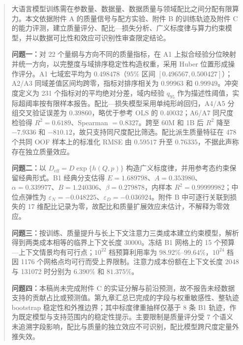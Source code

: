 \documentclass[bwprint]{gmcmthesis}
\numberwithin{equation}{section}
\numberwithin{figure}{section}
\numberwithin{table}{section}
\begin{document}
\begin{abstract}

大语言模型训练需在参数量、数据量、数据质量与领域配比之间分配有限算力。本文依据附件 A 的质量信号与配方实验、附件 B 的训练轨迹及附件 C 的能力评测，建立质量评分、配比—损失分析、广义标度律与算力约束模型，并以数据可比性和效应可识别性审查限定结论。

\textbf{问题一：}对 22 个量纲与方向不同的质量指标，在 A1 上拟合经验分位映射并统一方向，以完整度与域排序稳定性构造权重，采用 Huber 位置形成操作评分。A1 七域宏平均为 $0.498478$（$95\%$ 区间 $[0.496567,0.500427]$）；A2/A3 同域差值区间均跨零，指标对排序相关为 $0.99963$ 和 $0.99949$。冲突度定义为 231 个指标对的平均绝对分差，域内经验 $q_{95}$ 作为描述性阈值，实际超阈率按有限样本报告。配比—损失模型采用单纯形岭回归，A4/A5 分组交叉验证误差为 $0.39860$，略优于参考 OLS 的 $0.40032$；A6/A7 同尺度检验得 $R^2=0.6189$、Spearman $=0.8327$。跨至 60M 和 1B 后 $R^2$ 降至 $-7.9336$ 和 $-810.12$，故只支持同尺度配比筛选。配比派生质量特征在 478 个共同 OOF 样本上的标准化 RMSE 由 $0.59517$ 升至 $0.76335$，不据此声称存在独立质量效应。

\textbf{问题二：}以 $D_{\mathrm{eff}}=D\exp\{h(Q,p)\}$ 构造广义标度律，并用参考态约束保留经典形式。B1 经典分支估得 $E=1.689798$、$A=0.353980$、$\alpha=0.339977$、$B=1.240306$、$\beta=0.279878$，内样本 $R^2=0.99999982$；中位点弹性为 $\varepsilon_N=-0.048225$、$\varepsilon_D=-0.036924$。附件 B 中可逐行关联到损失的 17 维配比记录为零，故配比和质量扩展效应未估计，不解释为零效应。

\textbf{问题三：}按训练、质量提升与长上下文注意力三类成本建立约束模型，解析得到两类成本相等的临界上下文长度 $30000$。冻结 B1 网格上的 15 个预算—上下文情景均有可行点；$10^{22}$ 档预算利用率为 $98.92\%$--$99.64\%$，$10^{24}$ 档因 1176 个网格点均可行而受上界限制。注意力成本份额在上下文长度 2048 与 131072 时分别为 $6.390\%$ 和 $81.375\%$。

\textbf{问题四：}本稿尚未完成附件 C 的实证分解与前沿预测，故不报告未经数据支持的贡献占比或预测值。第九章汇总已完成的字段与权重敏感性、整轨迹 bootstrap 稳定性和外推边界；其中标度律重抽样仅基于 8 条 B1 轨迹，作为既定模型与支持范围内的稳定性提示。主要限制是质量评分受 7 个语义未追溯字段影响，配比与质量的独立效应不可识别，配比模型跨尺度定量外推失效。


\end{abstract}
\end{document}
